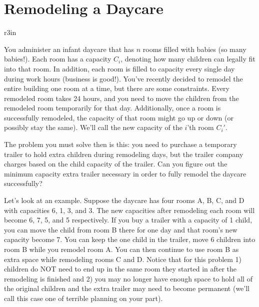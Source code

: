 \documentclass[11pt]{article}
\begin{document}
\section*{Remodeling a Daycare}

\begin{wrapfigure}{r}{3in}
\vspace{-10pt}
\vspace{-30pt}
\end{wrapfigure}

You administer an infant daycare that has $n$ rooms filled with babies (so many babies!). Each room has a capacity $C_i$, denoting how many children can legally fit into that room. In addition, each room is filled to capacity every single day during work hours (business is good!). You’ve recently decided to remodel the entire building one room at a time, but there are some constraints. Every remodeled room takes 24 hours, and you need to move the children from the remodeled room temporarily for that day. Additionally, once a room is successfully remodeled, the capacity of that room might go up or down (or possibly stay the same). We’ll call the new capacity of the $i$’th room $C_i'$.

The problem you must solve then is this: you need to purchase a temporary trailer to hold extra children during remodeling days, but the trailer company charges based on the child capacity of the trailer. Can you figure out the minimum capacity extra trailer necessary in order to fully remodel the daycare successfully?

Let’s look at an example. Suppose the daycare has four rooms A, B, C, and D with capacities 6, 1, 3, and 3. The new capacities after remodeling each room will become 6, 7, 5, and 5 respectively. If you buy a trailer with a capacity of 1 child, you can move the child from room B there for one day and that room’s new capacity become 7. You can keep the one child in the trailer, move 6 children into room B while you remodel room A. You can then continue to use room B as extra space while remodeling rooms C and D. Notice that for this problem 1) children do NOT need to end up in the same room they started in after the remodeling is finished and 2) you may no longer have enough space to hold all of the original children and the extra trailer may need to become permanent (we’ll call this case one of terrible planning on your part).
\end{document}
